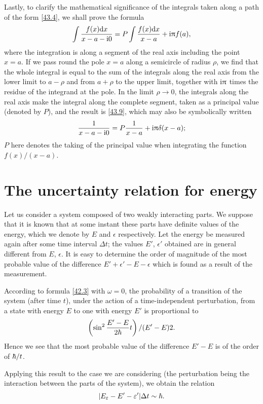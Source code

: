 Lastly, to clarify the mathematical significance of the integrals taken along a path of the form \eqref{43.4}, we shall prove the formula
\begin{equation}\label{43.9}
\int\frac{f(x)\mathrm{d} x}{x-a-\mathrm{i}0}=P\int\frac{f(x)\mathrm{d} x}{x-a}+\mathrm{i}\uppi f(a),
\end{equation}
where the integration is along a segment of the real axis including the point $ x = a $. If we pass round the pole $ x = a $ along a semicircle of radius $\rho$, we find that the whole integral is equal to the sum of the integrals along the real axis from the lower limit to $ a -\rho  $ and from $ a +\rho $ to the upper limit, together with $ \mathrm{i}\uppi $ times the residue of the integrand at the pole. In the limit $ \rho \to 0 $, the integrals along the real axis make the integral along the complete segment, taken as a principal value (denoted by $ P $), and the result is \eqref{43.9}, which may also be symbolically written
\begin{equation}\label{43.10}
\frac{1}{x-a-\mathrm{i}0}=P\frac{1}{x-a}+\mathrm{i}\uppi\delta(x-a);
\end{equation}
$ P $ here denotes the taking of the principal value when integrating the function $ f (x)/(x - a) $.

\section{The uncertainty relation for energy}\label{The uncertainty relation for energy}
Let us consider a system composed of two weakly interacting parts. We suppose that it is known that at some instant these parts have definite values of the energy, which we denote by $ E $ and $ \epsilon $ respectively. Let the energy be measured again after some time interval $ \Delta t $; the values $ E' $, $ \epsilon' $ obtained are in general different from $ E $, $ \epsilon $. It is easy to determine the order of magnitude of the most probable value of the difference $ E'+\epsilon'-E-\epsilon $ which is found as a result of the measurement.

According to formula \eqref{42.3} with $ \omega = 0 $, the probability of a transition of the system (after time $ t $), under the action of a time-independent perturbation, from a state with energy $ E $ to one with energy $ E' $ is proportional to
\[ \left(\sin^2\frac{E'-E}{2\hbar}t \right)/(E'-E)2. \]
Hence we see that the most probable value of the difference $ E'- E $ is of the order of $ \hbar/t $.

Applying this result to the case we are considering (the perturbation being the interaction between the parts of the system), we obtain the relation
\begin{equation}\label{44.1}
|E_\varepsilon-E'-\varepsilon'|\Delta t\sim\hbar.
\end{equation}



